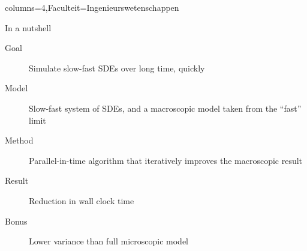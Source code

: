 \documentclass[portrait,a1paper,fontscale=0.45]{kuleuvenposter}
\begin{document}
\begin{poster}{columns=4,Faculteit=Ingenieurswetenschappen}
%
\begin{posterbox}%
[name=micro-macro modelling, column=0, row=0, boxColorOne=KULeuvenFaculteit!15!white, borderColor=KULeuvenFaculteit]%
{In a nutshell}%
\begin{description}
\item[Goal] Simulate slow-fast SDEs over long time, quickly
\item[Model] Slow-fast system of SDEs, and a macroscopic model taken from the ``fast'' limit
\item[Method] Parallel-in-time algorithm that iteratively improves the macroscopic result
\item[Result] Reduction in wall clock time
\item[Bonus] Lower variance than full microscopic model
\end{description}
\end{posterbox}


\end{poster}
\end{document}
